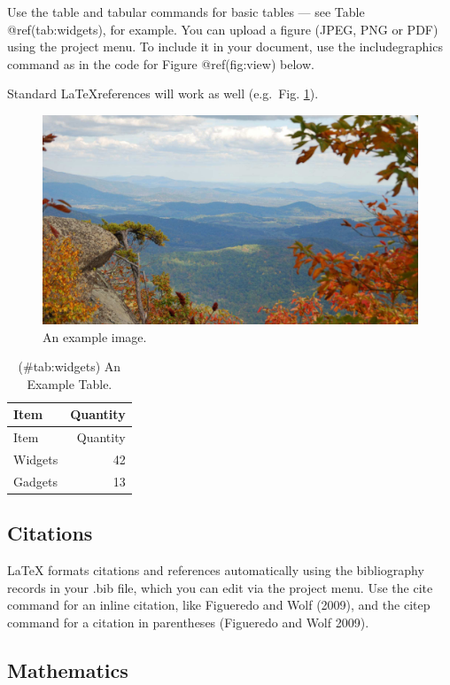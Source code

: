 \documentclass[fleqn,10pt,lineno]{wlpeerj} %
\begin{document}
Use the table and tabular commands for basic tables --- see Table
@ref(tab:widgets), for example. You can upload a figure (JPEG, PNG or
PDF) using the project menu. To include it in your document, use the
includegraphics command as in the code for Figure @ref(fig:view) below.

Standard \LaTeX references will work as well (e.g.~Fig. \ref{fig:view}).

\begin{figure}
\includegraphics[width=1\linewidth]{view} \caption{An example image.}\label{fig:view}
\end{figure}

\begin{longtable}[]{@{}lr@{}}
\caption{(\#tab:widgets) An Example Table.}\tabularnewline
\toprule
Item & Quantity\tabularnewline
\midrule
\endfirsthead
\toprule
Item & Quantity\tabularnewline
\midrule
\endhead
Widgets & 42\tabularnewline
Gadgets & 13\tabularnewline
\bottomrule
\end{longtable}

\subsection*{Citations}\label{citations}

LaTeX formats citations and references automatically using the
bibliography records in your .bib file, which you can edit via the
project menu. Use the cite command for an inline citation, like
Figueredo and Wolf (2009), and the citep command for a citation in
parentheses (Figueredo and Wolf 2009).

\subsection*{Mathematics}\label{mathematics}
\end{document}
